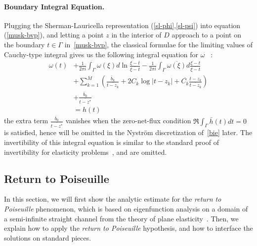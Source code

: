 \documentclass[10pt,twocolumn,letterpaper]{article}
\begin{document}
\paragraph*{Boundary Integral Equation.} Plugging the Sherman-Lauricella
representation (\ref{sl-phi},\ref{sl-psi}) into equation (\ref{musk-bvp}), and
letting a point $z$ in the interior of $D$ approach to a point on the boundary
$t\in \Gamma$ in~\eqref{musk-bvp}, the classical formulae for the limiting
values of Cauchy-type integral gives us the following integral equation for
$\omega$
~\cite{muschelisviliSingularIntegralEquations1972,greengardIntegralEquationMethods1996}:
\begin{align}
  \omega(t)
   & + \frac 1{2\pi i} \int_{\Gamma} \omega(\xi) d\ln \frac{\xi - t}{\overline{\xi - t}} - \frac 1{2\pi i} \int_\Gamma \overline{\omega(\xi)} d \frac{\xi - t}{\overline{\xi - t}} \label{bie} \\
   & + \sum_{k=1}^M \left( \frac{\bar b_k}{\overline{t- z_k}} +  2C_k \log |t-z_k| + \overline{C_k} \frac{t-z_k}{\overline{ t - z_k}} \right) \nonumber                                        \\
   & + \frac{\overline b_0}{\overline{ t - z^*}} \nonumber                                                                                                                                     \\
   & = h(t) \nonumber
\end{align}
the extra term $\frac{\overline b_0}{\overline{t - z^*}}$ vanishes 
when the zero-net-flux condition $\Re \int_\Gamma \bar h(t) dt = 0$ is satisfied, 
hence will be omitted in the Nystr\"om discretization of~\eqref{bie} later.
The invertibility of this integral equation is similar
to the standard proof of invertibility for elasticity problems~\cite{muskhelishviliBasicProblemsMathematical1977,greengardIntegralEquationMethods1996}, 
and are omitted.

\subsection{Return to Poiseuille\label{sec:ret2poi}}

In this section, we will first show the analytic estimate for the
\textit{return to Poiseuille} phenomenon, which is based on eigenfunction
analysis on a domain of a semi-infinite straight channel from the theory of
plane elasticity~\cite{gregoryTractionBoundaryValue1980}. Then, we explain how
to apply the \textit{return to Poiseuille} hypothesis, and how to interface the
solutions on standard pieces.
\end{document}
